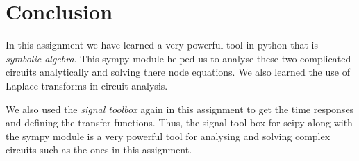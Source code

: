 \documentclass[11pt, a4paper]{article}
\begin{document}
\section{Conclusion}
    In this assignment we have learned a very powerful tool in python that is \textit{symbolic algebra}. This sympy module helped us to analyse these two complicated circuits analytically and solving there node equations. We also learned the use of Laplace transforms in circuit analysis.
    
    We also used the \textit{signal toolbox} again in this assignment to get the time responses and defining the transfer functions. Thus, the signal tool box for scipy along with the sympy module is a very powerful tool for analysing and solving complex circuits such as the ones in this assignment.
\end{document}
